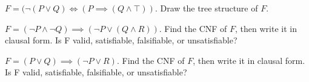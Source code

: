\documentclass[addpoints]{exam}
\begin{document}
\noindent

\begin{questions}
\question $F=(\lnot (P \lor Q) \iff (P \implies (Q \land \top))$. Draw the tree structure of $F$.

\vspace{30mm}

\question $F=(\lnot P \land \lnot Q) \implies (\lnot P \lor (Q \land R))$. Find the CNF of $F$, then write it in clausal form. 
Is F valid, satisfiable, falsifiable, or unsatisfiable?
\vspace{30mm}


\question $F=(P \lor Q) \implies (\lnot P \lor  R)$. Find the CNF of $F$, then write it in clausal form. 
Is F valid, satisfiable, falsifiable, or unsatisfiable?

\end{questions}
\end{document}
